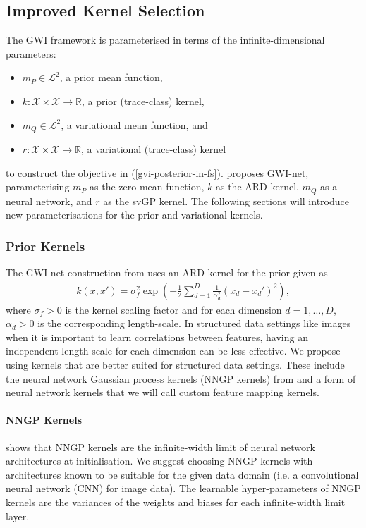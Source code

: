 \documentclass{article}
\numberwithin{equation}{section}
\begin{document}
\subsection{Improved Kernel Selection}
The GWI framework is parameterised in terms of the infinite-dimensional parameters:
\begin{itemize}
    \setlength\itemsep{-0.25em}
    \item $m_P \in \mathcal{L}^2$, a prior mean function,
    \item $k: \mathcal{X} \times \mathcal{X} \rightarrow \mathbb{R}$, a prior (trace-class) kernel,
    \item $m_Q \in \mathcal{L}^2$, a variational mean function, and
    \item $r: \mathcal{X} \times \mathcal{X} \rightarrow \mathbb{R}$, a variational (trace-class) kernel
\end{itemize}
to construct the objective in (\ref{gvi-posterior-in-fs}). \cite{wild2022generalized} proposes GWI-net, parameterising $m_P$ as the zero mean function, $k$ as the ARD kernel, $m_Q$ as a neural network, and $r$ as the svGP kernel.
The following sections will introduce new parameterisations for the prior and variational kernels.

\subsubsection{Prior Kernels}\label{prior-kernels}
The GWI-net construction from \cite{wild2022generalized} uses an ARD kernel for the prior given as
\begin{align}
    k(x, x') = \sigma^2_f \exp\left(-\frac{1}{2} \sum_{d=1}^D \frac{1}{\alpha_d^2}(x_d-x_d')^2\right),
\end{align}
where $\sigma_f > 0$ is the kernel scaling factor and for each dimension $d=1, \dots, D$, $\alpha_d >0$ is the corresponding length-scale.
In structured data settings like images when it is important to learn correlations between features, having an independent length-scale for each dimension can be less effective.
We propose using kernels that are better suited for structured data settings. These include the neural network Gaussian process kernels (NNGP kernels) from \cite{novak2019neural} and a form of neural network kernels that we will call custom feature mapping kernels.

\paragraph{NNGP Kernels} \cite{novak2019neural} shows that NNGP kernels are the infinite-width limit of neural network architectures at initialisation.
We suggest choosing NNGP kernels with architectures known to be suitable for the given data domain (i.e. a convolutional neural network (CNN) for image data).
The learnable hyper-parameters of NNGP kernels are the variances of the weights and biases for each infinite-width limit layer.
\end{document}
